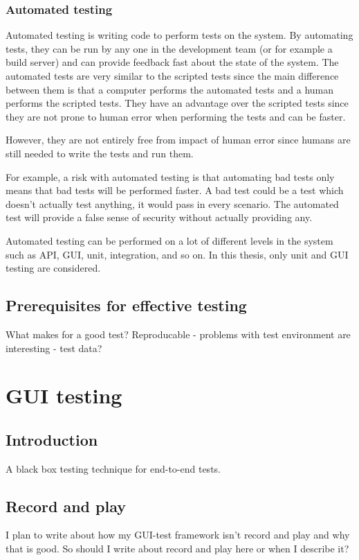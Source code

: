 \documentclass{article}
\begin{document}
			\subsubsection{Automated testing}
			Automated testing is writing code to perform tests on the system. By automating tests, they can be run by any one in the development team (or for example a build server) and can provide feedback fast about the state of the system. The automated tests are very similar to the scripted tests since the main difference between them is that a computer performs the automated tests and a human performs the scripted tests. 
			They have an advantage over the scripted tests since they are not prone to human error when performing the tests and can be faster. 

			However, they are not entirely free from impact of human error since humans are still needed to write the tests and run them. \cite{snakeoil} 

			For example, a risk with automated testing is that automating bad tests only means that bad tests will be performed faster. A bad test could be a test which doesn't actually test anything, it would pass in every scenario. The automated test will provide a false sense of security without actually providing any.  \cite{lessons}

			Automated testing can be performed on a lot of different levels in the system such as API, GUI, unit, integration, and so on. In this thesis, only unit and GUI testing are considered.

			\subsection{Prerequisites for effective testing}

			What makes for a good test? Reproducable - problems with test environment are interesting - test data?

	\section{GUI testing}
		\subsection{Introduction}
		A black box testing technique for end-to-end tests. 

		\subsection{Record and play}
		I plan to write about how my GUI-test framework isn't record and play and why that is good. So should I write about record and play here or when I describe it?
\end{document}
